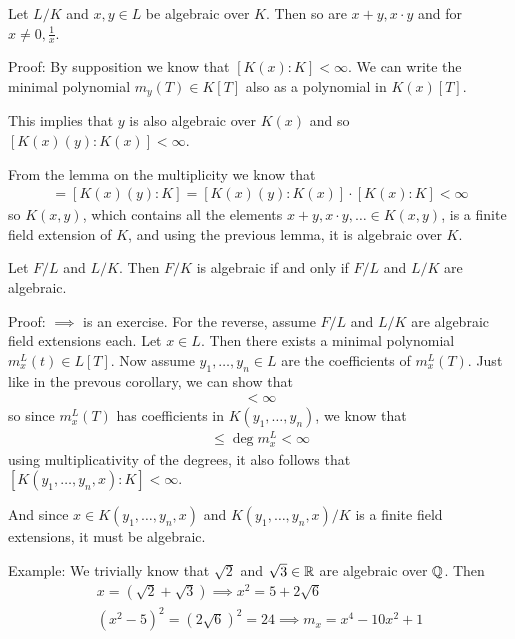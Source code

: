 \begin{corollary}[]
Let $L/K$ and $x,y \in L$ be algebraic over $K$. Then so are $x+y, x \cdot y$ and for $x \neq 0, \frac{1}{x}$.
\end{corollary}
Proof: By supposition we know that $[K(x):K] < \infty$. We can write the minimal polynomial $m_y(T) \in K[T]$ also as a polynomial in $K(x)[T]$. 

This implies that $y$ is also algebraic over $K(x)$ and so $[K(x)(y):K(x)] < \infty$.

From the lemma on the multiplicity we know that 
\begin{align*}
	[K(x,y):K] = [K(x)(y):K] = [K(x)(y):K(x)]\cdot [K(x):K] < \infty	
\end{align*}
so $K(x,y)$, which contains all the elements $x + y, x \cdot y, \ldots \in K(x,y)$, is a finite field extension of $K$, and using the previous lemma, it is algebraic over $K$.


\begin{corollary}[]
Let $F/L$ and $L/K$. Then $F/K$ is algebraic if and only if $F/L$ and $L/K$ are algebraic.
\end{corollary}
Proof: $\implies$ is an exercise.
For the reverse, assume $F/L$ and $L/K$ are algebraic field extensions each. Let $x \in L$. Then there exists a minimal polynomial
$m_x^{L}(t) \in L[T]$. Now assume $y_{1}, \ldots, y_{n} \in L$ are the coefficients of $m_x^{L}(T)$. Just like in the prevous corollary, we can show that
\begin{align*}
	[K(y_{1}, \ldots, y_{n}):K] < \infty
\end{align*}
so since $m_x^{L}(T)$ has coefficients in $K(y_{1}, \ldots, y_{n})$, we know that
\begin{align*}
	[K(y_{1}, \ldots, y_{n},x): K(y_{1}, \ldots, y_{n})] \leq \deg m_x^{L} < \infty
\end{align*}
using multiplicativity of the degrees, it also follows that $[K(y_{1}, \ldots, y_{n},x):K] < \infty$.

And since $x \in K(y_{1}, \ldots, y_{n},x)$ and $K(y_{1}, \ldots, y_{n},x) /K$ is a finite field extensions, it must be algebraic.


Example: We trivially know that $\sqrt{2}$ and $\sqrt{3} \in \mathbb{R}$ are algebraic over $\mathbb{Q}$. Then
\begin{align*}
	x = (\sqrt{2} + \sqrt{3}) \implies x^2 = 5 + 2 \sqrt{6}\\
	(x^2 - 5)^2 = (2 \sqrt{6})^2 = 24 \implies m_x = x^4 - 10x^2 + 1
\end{align*}





